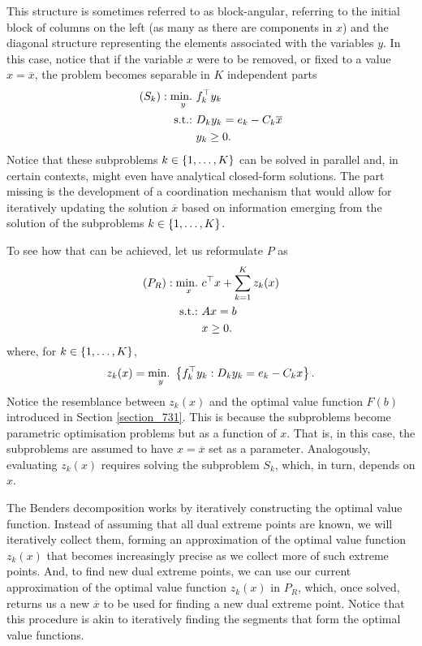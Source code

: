 This structure is sometimes referred to as block-angular, referring to the initial block of columns on the left (as many as there are components in $x$) and the diagonal structure representing the elements associated with the variables $y$. In this case, notice that if the variable $x$ were to be removed, or fixed to a value $x = \overline{x}$, the problem becomes separable in $K$ independent parts
% 
\begin{align*} 
	(S_k) : \mathop{\text{min.~}}_y & f_k^\top y_k \\
	\mathop{\text{s.t.:~}} & D_ky_k = e_k - C_k \overline{x} \\
	& y_k \geq 0.
\end{align*}
%
Notice that these subproblems $k \in \left\{ 1,\dots, K \right \}$ can be solved in parallel and, in certain contexts, might even have analytical closed-form solutions. The part missing is the development of a coordination mechanism that would allow for iteratively updating the solution $\overline{x}$ based on information emerging from the solution of the subproblems $k \in \left\{ 1,\dots, K \right \}$.

To see how that can be achieved, let us reformulate $P$ as 
%
\begin{align*}
	(P_R) : \mathop{\text{min.~}}_x & c^\top x + \sum_{k=1}^K z_k(x) \\
	\mathop{\text{s.t.:~}}   & Ax = b \\
	      & x \geq 0.
\end{align*}
%
where, for $k \in \left\{ 1,\dots, K \right \}$,  
%
\begin{equation*}
	z_k(x) = \mathop{\text{min.~}}_y \left\{ f_k^\top y_k : D_ky_k = e_k - C_k x \right \}.	
\end{equation*}
%
Notice the resemblance between $z_k(x)$ and the optimal value function $F(b)$ introduced in Section \ref{section_731}. This is because the subproblems become parametric optimisation problems but as a function of $x$. That is, in this case, the subproblems are assumed to have $x = \overline{x}$ set as a parameter. Analogously, evaluating $z_k(x)$ requires solving the subproblem $S_k$, which, in turn, depends on $x$. 

The Benders decomposition works by iteratively constructing the optimal value function. Instead of assuming that all dual extreme points are known, we will iteratively collect them, forming an approximation of the optimal value function $z_k(x)$ that becomes increasingly precise as we collect more of such extreme points. And, to find new dual extreme points, we can use our current approximation of the optimal value function $z_k(x)$ in $P_R$, which, once solved, returns us a new $\overline{x}$ to be used for finding a new dual extreme point. Notice that this procedure is akin to iteratively finding the segments that form the optimal value functions.


